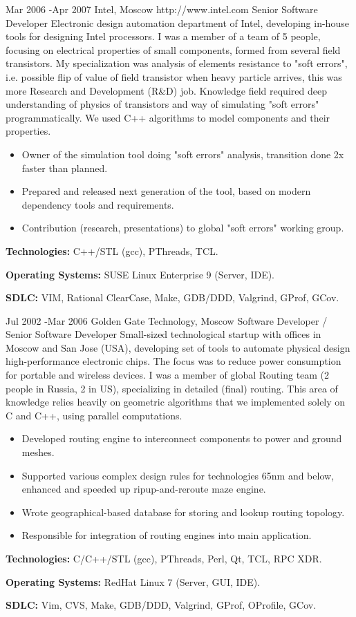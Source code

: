 \documentclass[10pt]{article} %
\begin{document}
\job
{Mar 2006 -}{Apr 2007}
{Intel, Moscow}
{http://www.intel.com}
{Senior Software Developer}
{Electronic design automation department of Intel, developing in-house tools for designing Intel processors.
I was a member of a team of 5 people, focusing on electrical properties of small components, formed from several 
field transistors. My specialization was analysis of elements resistance to "soft errors", i.e. possible
flip of value of field transistor when heavy particle arrives, this was more Research and Development (R\&D) job.
Knowledge field required deep understanding of physics of transistors and way of simulating "soft errors" programmatically.
We used C++ algorithms to model components and their properties.}
{\begin{itemize}
\item{Owner of the simulation tool doing "soft errors" analysis, transition done 2x faster than planned.}
\item{Prepared and released next generation of the tool, based on modern dependency tools and requirements.}
\item{Contribution (research, presentations) to global "soft errors" working group.}
\end{itemize}}
{\rule{0mm}{5mm}\textbf{Technologies:} C++/STL (gcc), PThreads, TCL.\\
\rule{0mm}{5mm}\textbf{Operating Systems:} SUSE Linux Enterprise 9 (Server, IDE).\\
\rule{0mm}{5mm}\textbf{SDLC:} VIM, Rational ClearCase, Make, GDB/DDD, Valgrind, GProf, GCov.
}


\job
{Jul 2002 -}{Mar 2006}
{Golden Gate Technology, Moscow}
{}
{Software Developer / Senior Software Developer}
{Small-sized technological startup with offices in Moscow and San Jose (USA), developing set of tools
to automate physical design high-performance electronic chips. The focus was to reduce power consumption
for portable and wireless devices. I was a member of global Routing team (2 people in Russia, 2 in US), 
specializing in detailed (final) routing. This area of knowledge relies heavily on geometric algorithms
that we implemented solely on C and C++, using parallel computations.}
{\begin{itemize}
\item{Developed routing engine to interconnect components to power and ground meshes.}
\item{Supported various complex design rules for technologies 65nm and below, enhanced and speeded up ripup-and-reroute maze engine.}
\item{Wrote geographical-based database for storing and lookup routing topology.}
\item{Responsible for integration of routing engines into main application.}
\end{itemize}}
{\rule{0mm}{5mm}\textbf{Technologies:} C/C++/STL (gcc), PThreads, Perl, Qt, TCL, RPC XDR.\\
\rule{0mm}{5mm}\textbf{Operating Systems:} RedHat Linux 7 (Server, GUI, IDE).\\
\rule{0mm}{5mm}\textbf{SDLC:} Vim, CVS, Make, GDB/DDD, Valgrind, GProf, OProfile, GCov.
}
\end{document}
